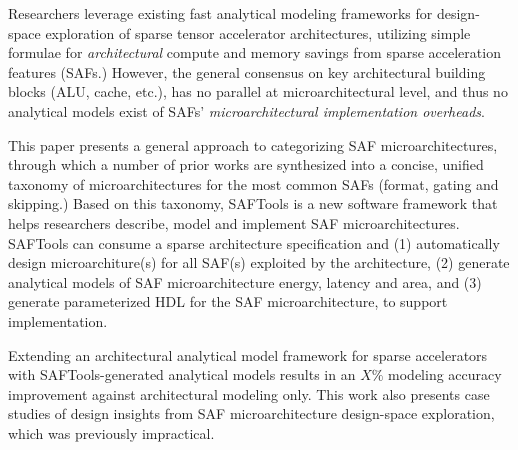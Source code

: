 % 
% 
%
Researchers leverage existing fast analytical modeling frameworks for design-space exploration of sparse tensor accelerator architectures, utilizing simple formulae for \textit{architectural} compute and memory savings from sparse acceleration features (SAFs.) However, the general consensus on key architectural building blocks (ALU, cache, etc.), has no parallel at microarchitectural level, and thus no analytical models exist of SAFs' \textit{microarchitectural implementation overheads}. 

This paper presents a general approach to categorizing SAF microarchitectures, through which a number of prior works are synthesized into a concise, unified taxonomy of microarchitectures for the most common SAFs (format, gating and skipping.) Based on this taxonomy, SAFTools is a new software framework that helps researchers describe, model and implement SAF microarchitectures. SAFTools can consume a sparse architecture specification and (1) automatically design microarchiture(s) for all SAF(s) exploited by the architecture, (2) generate analytical models of SAF microarchitecture energy, latency and area, and (3) generate parameterized HDL for the SAF microarchitecture, to support implementation.

Extending an architectural analytical model framework for sparse accelerators with SAFTools-generated analytical models results in an $X\%$ modeling accuracy improvement against architectural modeling only. This work also presents case studies of design insights from SAF microarchitecture design-space exploration, which was previously impractical.
